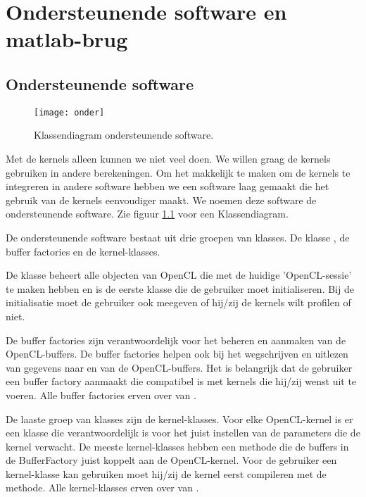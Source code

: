 \chapter{Ondersteunende software en matlab-brug}
\label{h:ondersteunende}
\section{Ondersteunende software}

\begin{figure}[h!]
\centering
\texttt{[image: onder]}
\caption{\label{fig:onder} Klassendiagram ondersteunende software.}
\end{figure}

Met de kernels alleen kunnen we niet veel doen. We willen graag de kernels gebruiken in andere berekeningen. Om het makkelijk te maken om de kernels te integreren in andere software hebben we een software laag gemaakt die het gebruik van de kernels eenvoudiger maakt. We noemen deze software de ondersteunende software. Zie figuur \ref{fig:onder} voor een Klassendiagram.

De ondersteunende software bestaat uit drie groepen van klasses. De klasse , de buffer factories en de kernel-klasses.

De klasse  beheert alle objecten van OpenCL die met de huidige 'OpenCL-sessie' te maken hebben en is de eerste klasse die de gebruiker moet initialiseren. Bij de initialisatie moet de gebruiker ook meegeven of hij/zij de kernels wilt profilen of niet.

De buffer factories zijn verantwoordelijk voor het beheren en aanmaken van de OpenCL-buffers. De buffer factories helpen ook bij het wegschrijven en uitlezen van gegevens naar en van de OpenCL-buffers. Het is belangrijk dat de gebruiker een buffer factory aanmaakt die compatibel is met kernels die hij/zij wenst uit te voeren. Alle buffer factories erven over van .

De laaste groep van klasses zijn de kernel-klasses. Voor elke OpenCL-kernel is er een klasse die verantwoordelijk is voor het juist instellen van de parameters die de kernel verwacht. De meeste kernel-klasses hebben een methode  die de buffers in de BufferFactory juist koppelt aan de OpenCL-kernel. Voor de gebruiker een kernel-klasse kan gebruiken moet hij/zij de kernel eerst compileren met de  methode. Alle kernel-klasses erven over van .

